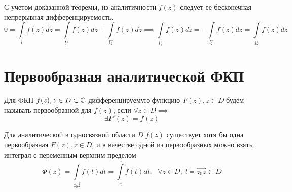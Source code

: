\documentclass[../../main.tex]{subfiles}
\begin{document}
С учетом доказанной теоремы, из аналитичности $f(z)$ следует ее
бесконечная непрерывная дифференцируемость.
\[ 0 = \int\limits_{l} f(z) dz = \int\limits_{l_1^+} f(z) dz +
\int\limits_{l_2^-} f(z) dz 
 \implies \int\limits_{l_1^+} f(z) dz =
- \int\limits_{l_2^-} f(z) dz = \int\limits_{l_2^+} f(z) dz \]
\section{Первообразная аналитической ФКП}
Для ФКП $ f(z), z \in D \subset \mathbb{C} $ дифференцируемую функцию $F(z), z \in
D$ будем называть первообразной для $f(z)$, если $\forall z \in D \implies$
\begin{equation}
	\label{lec31:2}
	\exists F'(z) = f(z)
\end{equation}
\begin{thm}
	Для аналитической в односвязной области $D \ f(z)$ существует хотя бы
	одна первообразная $F(z), z \in D$, и в качестве одной из первообразных
	можно взять интеграл с переменным верхним пределом
	\begin{equation}
		\label{lec31:3}
		\Phi(z) = \int\limits_{\overrightarrow{z_0 z}} f(t) dt =
		\int\limits_{z_0}^z f(t) dt, \ \ \ \forall z \in D, \ l =
		\overrightarrow{z_0 z} \subset D
	\end{equation} 
\end{thm}
\end{document}
